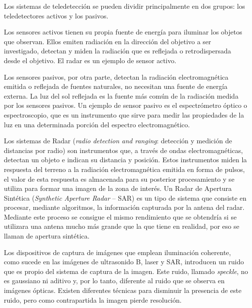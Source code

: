 Los sistemas de teledetección se pueden dividir principalmente en dos grupos: los teledetectores activos y los pasivos. 

Los sensores activos tienen su propia fuente de energía para iluminar los objetos que observan. 
Ellos emiten radiación en la dirección del objetivo a ser investigado, detectan y miden la radiación que es reflejada o retrodispersada desde el objetivo. 
El radar es un ejemplo de sensor activo.

Los sensores pasivos, por otra parte, detectan la radiación electromagnética emitida o reflejada de fuentes naturales, no necesitan una fuente de energía externa. 
La luz del sol reflejada es la fuente más común de la radiación medida por los sensores pasivos. 
Un ejemplo de sensor pasivo es el espectrómetro óptico o espectroscopio, que es un instrumento que sirve para medir las propiedades de la luz en una determinada porción del espectro electromagnético. 



Los sistemas de Radar (\textit{radio detection and ranging}: detección y medición de distancias por radio) son instrumentos que, a través de ondas electromagnéticas, detectan un objeto e indican su distancia y posición. Estos instrumentos miden la respuesta del terreno a la radiación electromagnética emitida en forma de pulsos, el valor de esta respuesta es almacenada para su posterior procesamiento y se utiliza para formar una imagen de la zona de interés. Un Radar de Apertura Sintética (\textit{Synthetic Aperture Radar} -- SAR) es un tipo de sistema que consiste en procesar, mediante algoritmos, la información capturada por la antena del radar. Mediante este proceso se consigue el mismo rendimiento que se obtendría si se utilizara una antena mucho más grande que la que tiene en realidad, por eso se llaman de apertura sintética. 

Los dispositivos de captura de imágenes que emplean iluminación coherente, como sucede en las imágenes de ultrasonido B, laser y SAR, introducen un ruido que es propio del sistema de captura de la imagen. 
Este ruido, llamado \textit{speckle}, no es gaussiano ni aditivo y, por lo tanto, diferente al ruido que se observa en imágenes ópticas. 
Existen diferentes técnicas para disminuir la presencia de este ruido, pero como contrapartida la imagen pierde resolución.

